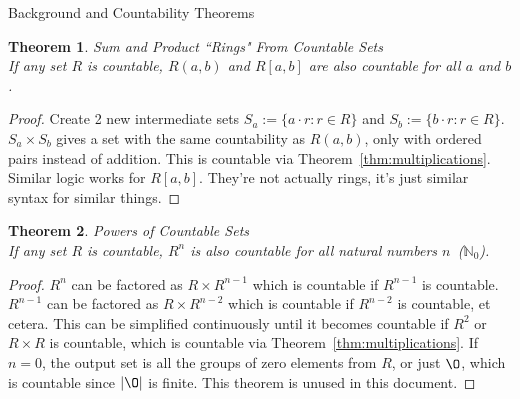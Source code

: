 \documentclass[12pt]{article}
\newtheorem{thm}{Theorem}
\begin{document}
\begin{section}{Background and Countability Theorems}
	\begin{thm}\label{thm:rings}
		\emph{Sum and Product ``Rings" From Countable Sets}\\
		\indent\emph{If any set $R$ is countable, $R(a, b)$ and $R[a, b]$ are also countable
		for all $a$ and $b$.}
	\end{thm}\begin{proof}
		Create 2 new intermediate sets $S_a := \{a\cdot r:r\in R\}$ and $S_b := \{b\cdot r:r\in R\}$.
		$S_a\times S_b$ gives a set with the same countability as $R(a,b)$, only with
		ordered pairs instead of addition. This is countable via Theorem~\ref{thm:multiplications}.
		Similar logic works for $R[a,b]$. They're not actually rings, it's just similar syntax for
		similar things.
	\end{proof}

	\begin{thm}\label{thm:powers}
		\emph{Powers of Countable Sets}\\
		\indent\emph{If any set $R$ is countable, $R^n$ is also countable for all natural numbers $n$
		\,($\mathbb N_0$).}
	\end{thm}\begin{proof}
		$R^n$ can be factored as $R\times R^{n-1}$ which is countable if $R^{n-1}$ is countable.
		$R^{n-1}$ can be factored as $R\times R^{n-2}$ which is countable if $R^{n-2}$ is countable,
		et cetera. This can be simplified continuously until it becomes countable if $R^2$ or
		$R\times R$ is countable, which is countable via Theorem~\ref{thm:multiplications}. If $n=0$,
		the output set is all the groups of zero elements from $R$, or just $\O$, which is countable
		since $\left|\O\right|$ is finite. This theorem is unused in this document.
	\end{proof}


\end{section}
\end{document}
